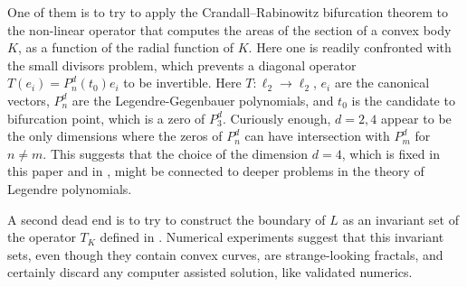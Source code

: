 \documentclass{amsart}
\begin{document}
		One of them is to try to apply the Crandall--Rabinowitz bifurcation theorem to the non-linear operator that computes the areas of the section of a convex body $K$, as a function of the radial function of $K$. Here one is readily confronted with the small divisors problem, which prevents a diagonal operator $T(e_i) = P^d_n(t_0) e_i$ to be invertible. Here $T: \ell_2 \to \ell_2$, $e_i$ are the canonical vectors, $P^d_n$ are the Legendre-Gegenbauer polynomials, and $t_0$ is the candidate to bifurcation point, which is a zero of $P^d_3$. Curiously enough, $d=2,4$ appear to be the only dimensions where the zeros of $P^d_n$ can have intersection with $P^d_m$ for $n \neq m$. This suggests that the choice of the dimension $d=4$, which is fixed in this paper and in \cite{haddad2026convex}, might be connected to deeper problems in the theory of Legendre polynomials.

		A second dead end is to try to construct the boundary of $L$ as an invariant set of the operator $T_K$ defined in \cite{haddad2026convex}. Numerical experiments suggest that this invariant sets, even though they contain convex curves, are strange-looking fractals, and certainly discard any computer assisted solution, like validated numerics.



\end{document}
